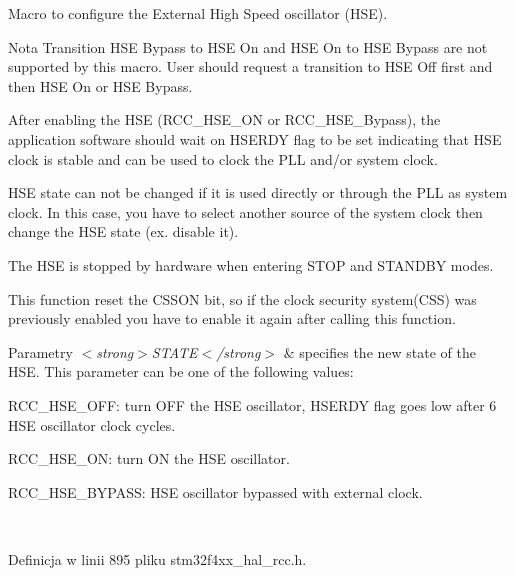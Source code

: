 Macro to configure the External High Speed oscillator (H\+SE). 

\begin{DoxyNote}{Nota}
Transition H\+SE Bypass to H\+SE On and H\+SE On to H\+SE Bypass are not supported by this macro. User should request a transition to H\+SE Off first and then H\+SE On or H\+SE Bypass. 

After enabling the H\+SE (R\+C\+C\+\_\+\+H\+S\+E\+\_\+\+ON or R\+C\+C\+\_\+\+H\+S\+E\+\_\+\+Bypass), the application software should wait on H\+S\+E\+R\+DY flag to be set indicating that H\+SE clock is stable and can be used to clock the P\+LL and/or system clock. 

H\+SE state can not be changed if it is used directly or through the P\+LL as system clock. In this case, you have to select another source of the system clock then change the H\+SE state (ex. disable it). 

The H\+SE is stopped by hardware when entering S\+T\+OP and S\+T\+A\+N\+D\+BY modes. 

This function reset the C\+S\+S\+ON bit, so if the clock security system(\+C\+S\+S) was previously enabled you have to enable it again after calling this function. 
\end{DoxyNote}

\begin{DoxyParams}{Parametry}
{\em $<$strong$>$\+S\+T\+A\+T\+E$<$/strong$>$} & specifies the new state of the H\+SE. This parameter can be one of the following values\+: \begin{DoxyItemize}
\item R\+C\+C\+\_\+\+H\+S\+E\+\_\+\+O\+FF\+: turn O\+FF the H\+SE oscillator, H\+S\+E\+R\+DY flag goes low after 6 H\+SE oscillator clock cycles. \item R\+C\+C\+\_\+\+H\+S\+E\+\_\+\+ON\+: turn ON the H\+SE oscillator. \item R\+C\+C\+\_\+\+H\+S\+E\+\_\+\+B\+Y\+P\+A\+SS\+: H\+SE oscillator bypassed with external clock. \end{DoxyItemize}
\\
\hline
\end{DoxyParams}


Definicja w linii 895 pliku stm32f4xx\+\_\+hal\+\_\+rcc.\+h.

